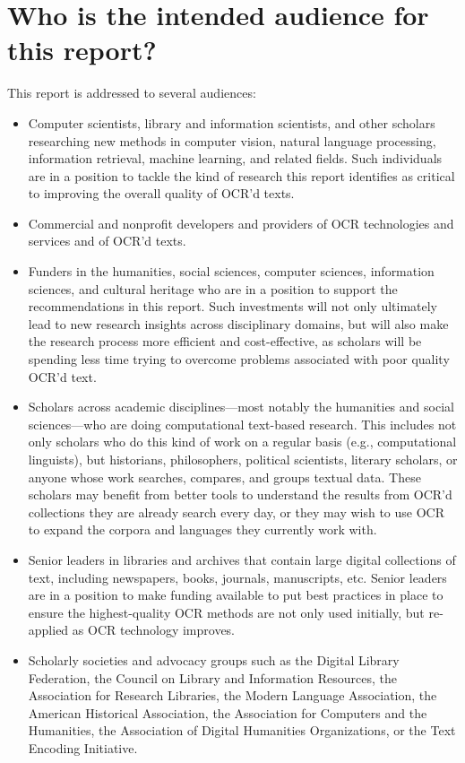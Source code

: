 \documentclass[twoside,11pt]{report}
\begin{document}
\section{Who is the intended audience for this report?}

This report is addressed to several audiences:
\begin{itemize}

\item Computer scientists, library and information scientists, and other scholars researching new methods in computer vision, natural language processing, information retrieval, machine learning, and related fields. Such individuals are in a position to tackle the kind of research this report identifies as critical to improving the overall quality of OCR'd texts.

\item Commercial and nonprofit developers and providers of OCR technologies and services and of OCR'd texts.

\item Funders in the humanities, social sciences, computer sciences, information sciences, and cultural heritage who are in a position to support the recommendations in this report. Such investments will not only ultimately lead to new research insights across disciplinary domains, but will also make the research process more efficient and cost-effective, as scholars will be spending less time trying to overcome problems associated with poor quality OCR'd text.

\item Scholars across academic disciplines---most notably the humanities and social sciences---who are doing computational text-based research. This includes not only scholars who do this kind of work on a regular basis (e.g., computational linguists), but historians, philosophers, political scientists, literary scholars, or anyone whose work searches, compares, and groups textual data. These scholars may benefit from better tools to understand the results from OCR'd collections they are already search every day, or they may wish to use OCR to expand the corpora and languages they currently work with.

\item Senior leaders in libraries and archives that contain large digital collections of text, including newspapers, books, journals, manuscripts, etc. Senior leaders are in a position to make funding available to put best practices in place to ensure the highest-quality OCR methods are not only used initially, but re-applied as OCR technology improves.

\item Scholarly societies and advocacy groups such as the Digital Library Federation, the Council on Library and Information Resources, the Association for Research Libraries, the Modern Language Association, the American Historical Association, the Association for Computers and the Humanities, the Association of Digital Humanities Organizations, or the Text Encoding Initiative.

\end{itemize}
\end{document}
